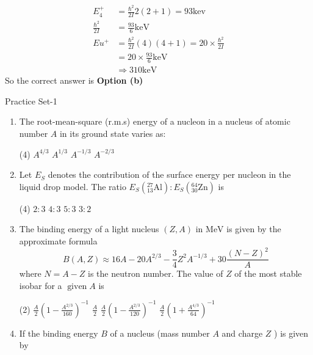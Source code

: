 \begin{answer}
	\begin{align*}
	E_{4}^{+}&=\frac{\hbar^{2}}{2 I} 2(2+1)=93 \mathrm{kev} \\
	\frac{\hbar^{2}}{2 I}&=\frac{93}{6} \mathrm{keV}\\
	E u^{+}&=\frac{\hbar^{2}}{2 I}(4)(4+1)=20 \times \frac{\hbar^{2}}{2 I}\\
	&=20 \times \frac{93}{6} \mathrm{keV} \\
	&\Rightarrow 310 \mathrm{keV}
	\end{align*}
	So the correct answer is \textbf{Option (b)}
\end{answer}
\newpage
\begin{abox}
	Practice Set-1
\end{abox}
\begin{enumerate}
	\item  The root-mean-square (r.m.s) energy of a nucleon in a nucleus of atomic number $A$ in its ground state varies as:
	 \begin{tasks}(4)
		\task[\textbf{a.}]$A^{4 / 3}$
		\task[\textbf{b.}]$A^{1 / 3}$
		\task[\textbf{c.}]$A^{-1 / 3}$
		\task[\textbf{d.}]$A^{-2 / 3}$ 
	\end{tasks}
	\item  Let $E_S$ denotes the contribution of the surface energy per nucleon in the liquid drop model. The ratio $E_S\left({ }_{13}^{27} \mathrm{Al}\right): E_S\left({ }_{30}^{64} \mathrm{Zn}\right)$ is
	{}
	 \begin{tasks}(4)
		\task[\textbf{a.}]$2: 3$
		\task[\textbf{b.}]$4: 3$
		\task[\textbf{c.}]$5: 3$
		\task[\textbf{d.}]$3: 2$ 
	\end{tasks}
	\item  The binding energy of a light nucleus $(Z, A)$ in $\mathrm{MeV}$ is given by the approximate formula
	$$
	B(A, Z) \approx 16 A-20 A^{2 / 3}-\frac{3}{4} Z^2 A^{-1 / 3}+30 \frac{(N-Z)^2}{A}
	$$
	where $N=A-Z$ is the neutron number. The value of $Z$ of the most stable isobar for a $\operatorname{given} A$ is
	{}
 \begin{tasks}(2)
	\task[\textbf{a.}] $\frac{A}{2}\left(1-\frac{A^{2 / 3}}{160}\right)^{-1}$
	\task[\textbf{b.}]$\frac{A}{2}$
	\task[\textbf{c.}]$\frac{A}{2}\left(1-\frac{A^{2 / 3}}{120}\right)^{-1}$
	\task[\textbf{d.}] $\frac{A}{2}\left(1+\frac{A^{4 / 3}}{64}\right)^{-1}$
\end{tasks}
	\item  If the binding energy $B$ of a nucleus (mass number $A$ and charge $Z$ ) is given by

\end{enumerate}
